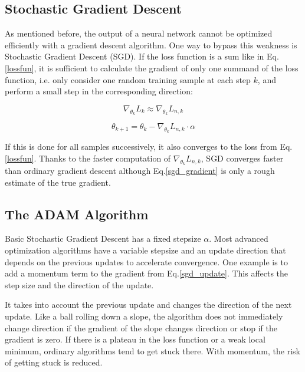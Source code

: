 \subsection{Stochastic Gradient Descent}
\label{sec:sgd}

As mentioned before, the output of a neural network cannot be optimized efficiently with a gradient descent algorithm. One way to bypass this weakness is Stochastic Gradient Descent (SGD). If the loss function is a sum like in Eq. \ref{lossfun}, it is sufficient to calculate the gradient of only one summand of the loss function, i.e. only consider one random training sample at each step $k$, and perform a small step in the corresponding direction:

\begin{equation}
\nabla_{\theta_k}L_k \approx \nabla_{\theta_k}L_{n,k}
\label{sgd_gradient}
\end{equation}

\begin{equation}
\theta_{k+1} = \theta_k - \nabla_{\theta_k}L_{n,k} \cdot \alpha
\label{sgd_update}
\end{equation}

If this is done for all samples successively, it also converges to the loss from Eq.\ref{lossfun}. 
Thanks to the faster computation of $\nabla_{\theta_k}L_{n,k}$, SGD converges faster than ordinary gradient descent although Eq.\ref{sgd_gradient} is only a rough estimate of the true gradient.


\subsection{The ADAM Algorithm}
\label{sec:adam}

Basic Stochastic Gradient Descent has a fixed stepsize $\alpha$. Most advanced optimization algorithms have a variable stepsize and an update direction that depends on the previous updates to accelerate convergence. One example is to add a momentum term to the gradient from Eq.\ref{sgd_update}. This affects the step size and the direction of the update.

It takes into account the previous update and changes the direction of the next update. Like a ball rolling down a slope, the algorithm does not immediately change direction if the gradient of the slope changes direction or stop if the gradient is zero. If there is a plateau in the loss function or a weak local minimum, ordinary algorithms tend to get stuck there. With momentum, the risk of getting stuck is reduced.

